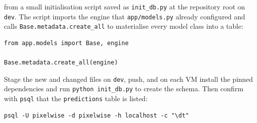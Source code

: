  from a small initialisation script
saved as \texttt{init\_db.py} at the repository root on \texttt{dev}.
The script imports the engine that \texttt{app/models.py} already
configured and calls \texttt{Base.metadata.create\_all} to materialise
every model class into a table:

\begin{verbatim}
from app.models import Base, engine

Base.metadata.create_all(engine)
\end{verbatim}


Stage the new and changed files on \texttt{dev}, push, and on each VM
install the pinned dependencies and run \texttt{python init\_db.py} to
create the schema. Then confirm with \texttt{psql} that the
\texttt{predictions} table is listed:

\begin{verbatim}
psql -U pixelwise -d pixelwise -h localhost -c "\dt"
\end{verbatim}


